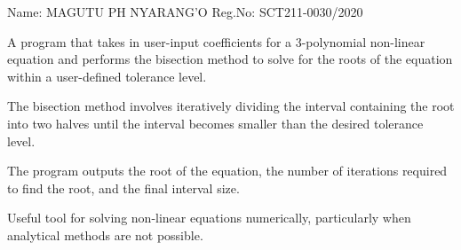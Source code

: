 \documentclass{"Solving Non-Linear Expressions Using Bisector Method in Python"}
\begin{document}
Name: MAGUTU PH NYARANG'O
Reg.No: SCT211-0030/2020

A program that takes in user-input coefficients for a 3-polynomial non-linear equation and performs the bisection method to solve for the roots of the equation within a user-defined tolerance level. 

The bisection method involves iteratively dividing the interval containing the root into two halves until the interval becomes smaller than the desired tolerance level. 

The program outputs the root of the equation, the number of iterations required to find the root, and the final interval size.

Useful tool for solving non-linear equations numerically, particularly when analytical methods are not possible.
\end{document}
